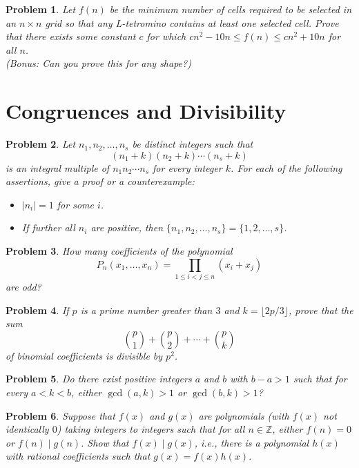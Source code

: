 \documentclass[12pt]{article}
\newtheorem{problem}{Problem}
\begin{document}
\begin{problem}
Let $f(n)$ be the minimum number of cells required to be selected in an $n \times n$ grid so that any L-tetromino contains at least one selected cell. Prove that there exists some constant $c$ for which $cn^2 - 10n \leq f(n) \leq cn^2 + 10n$ for all $n$.\\
(Bonus: Can you prove this for any shape?)
\end{problem}

\section*{Congruences and Divisibility}

\begin{problem}
Let $n_1, n_2, \ldots, n_s$ be distinct integers such that
\[
(n_1 + k)(n_2 + k) \cdots (n_s + k)
\]
is an integral multiple of $n_1 n_2 \cdots n_s$ for every integer $k$. For each of the following assertions, give a proof or a counterexample:
\begin{itemize}
    \item $|n_i| = 1$ for some $i$.
    \item If further all $n_i$ are positive, then $\{n_1, n_2, \ldots, n_s\} = \{1, 2, \ldots, s\}$.
\end{itemize}
\end{problem}

\begin{problem}
How many coefficients of the polynomial
\[
P_n(x_1, \ldots, x_n) = \prod_{1 \leq i < j \leq n} (x_i + x_j)
\]
are odd?
\end{problem}

\begin{problem}
If $p$ is a prime number greater than $3$ and $k = \lfloor 2p/3 \rfloor$, prove that the sum
\[
\binom{p}{1} + \binom{p}{2} + \cdots + \binom{p}{k}
\]
of binomial coefficients is divisible by $p^2$.
\end{problem}

\begin{problem}
Do there exist positive integers $a$ and $b$ with $b - a > 1$ such that for every $a < k < b$, either $\gcd(a, k) > 1$ or $\gcd(b, k) > 1$?
\end{problem}

\begin{problem}
Suppose that $f(x)$ and $g(x)$ are polynomials (with $f(x)$ not identically $0$) taking integers to integers such that for all $n \in \mathbb{Z}$, either $f(n) = 0$ or $f(n) \mid g(n)$. Show that $f(x) \mid g(x)$, i.e., there is a polynomial $h(x)$ with rational coefficients such that $g(x) = f(x) h(x)$.
\end{problem}
\end{document}
